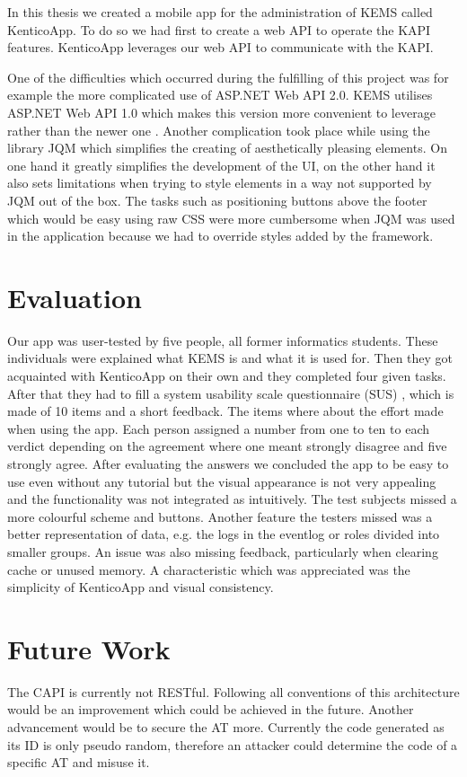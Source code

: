 In this thesis we created a mobile app for the administration of KEMS called KenticoApp. To do so we had first to create a web API to operate the KAPI features. KenticoApp leverages our web API to communicate with the KAPI. 

One of the difficulties which occurred during the fulfilling of this project was for example the more complicated use of ASP.NET Web API 2.0. KEMS utilises ASP.NET Web API 1.0 which makes this version more convenient to leverage rather than the newer one \cite{kenticoWebAPI}. Another complication took place while using the library JQM which simplifies the creating of aesthetically pleasing elements. On one hand it greatly simplifies the development of the UI, on the other hand it also sets limitations when trying to style elements in a way not supported by JQM out of the box. The tasks such as positioning buttons above the footer which would be easy using raw CSS were more cumbersome when JQM was used in the application because we had to override styles added by the framework.

\section{Evaluation}
Our app was user-tested by five people, all former informatics students. These individuals were explained what KEMS is and what it is used for. Then they got acquainted with KenticoApp on their own and they completed four given tasks. After that they had to fill a system usability scale questionnaire (SUS) \cite{sus}, which is made of 10 items and a short feedback. The items where about the effort made when using the app. Each person assigned a number from one to ten to each verdict depending on the agreement where one meant strongly disagree and five strongly agree. After evaluating the answers we concluded the app to be easy to use even without any tutorial but the visual appearance is not very appealing and the functionality was not integrated as intuitively. The test subjects missed a more colourful scheme and buttons. Another feature the testers missed was a better representation of data, e.g. the logs in the eventlog or roles divided into smaller groups. An issue was also missing feedback, particularly when clearing cache or unused memory. A characteristic which was appreciated was the simplicity of KenticoApp and visual consistency.

\section{Future Work}
The CAPI is currently not RESTful. Following all conventions of this architecture would be an improvement which could be achieved in the future. Another advancement would be to secure the AT more. Currently the code generated as its ID is only pseudo random, therefore an attacker could determine the code of a specific AT and misuse it. 


